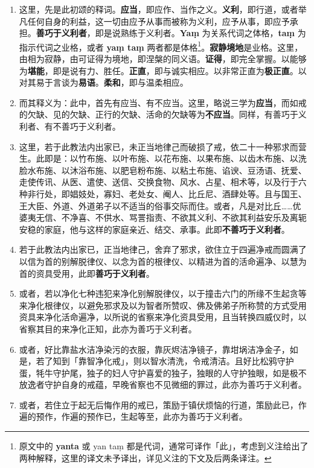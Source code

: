 \begin{enumerate}\item 这里，先是此初颂的释词。\textbf{应当}，即应作、当作之义。\textbf{义利}，即行道，或者举凡任何自身的利益，这一切由应予从事而被称为义利，应予从事，即应予承担。\textbf{善巧于义利者}，即是说熟练于义利者。\textbf{Yaṃ} 为关系代词之体格，\textbf{taṃ} 为指示代词之业格，或者 \textbf{yaṃ taṃ} 两者都是体格\footnote{原文中的 \textbf{yanta} 或 yan taṃ 都是代词，通常可译作「此」，考虑到义注给出了两种解释，这里的译文未予译出，详见义注的下文及后两条译注。}。\textbf{寂静境地}是业格。这里，由相为寂静，由可证得为境地，即涅槃的同义语。\textbf{证得}，即完全掌握。以能够为\textbf{堪能}，即是说有力、胜任。\textbf{正直}，即与诚实相应。以非常正直为\textbf{极正直}。以对其易于言谈为\textbf{易语}。\textbf{柔和}，即与温柔相应。
\item 而其释义为：此中，首先有应当、有不应当。这里，略说三学为\textbf{应当}，而如戒的欠缺、见的欠缺、正行的欠缺、活命的欠缺等为\textbf{不应当}。同样，有善巧于义利者、有不善巧于义利者。
\item 这里，若于此教法内出家已，未正当地律己而破损了戒，依二十一种邪求而营生。此即是：以竹布施、以叶布施、以花布施、以果布施、以齿木布施、以洗脸水布施、以沐浴布施、以肥皂粉布施、以粘土布施、谄谀、豆汤语、抚爱、走使传讯、从医、遣使、送信、交换食物、风水、占星、相术等，以及行于六种非行处，即娼妓处，寡妇、老处女、阉人、比丘尼、酒肆处等。且与国王、王大臣、外道、外道弟子以不适当的俗事交际而住。或者，凡是对比丘……优婆夷无信、不净喜、不供水、骂詈指责、不欲其义利、不欲其利益安乐及离轭安稳的家庭，他与这样的家庭亲近、结交、承事。此即\textbf{不善巧于义利者}。
\item 若于此教法内出家已，正当地律己，舍弃了邪求，欲住立于四遍净戒而圆满了以信为首的别解脱律仪、以念为首的根律仪、以精进为首的活命遍净、以慧为首的资具受用，此即\textbf{善巧于义利者}。
\item 或者，若以净化七种违犯来净化别解脱律仪，以于撞击六门的所缘不生起贪等来净化根律仪，以避免邪求及以为智者所赞叹、佛及佛弟子所称赞的方式受用资具来净化活命遍净，以所说的省察来净化资具受用，且当转换四威仪时，以省察其目的来净化正知，此亦为善巧于义利者。
\item 或者，好比靠盐水洁净染污的衣服，靠灰烬洁净镜子，靠坩埚洁净金子，如是，若了知到「靠智净化戒」，则以智水清洗，令戒清洁。且好比松鸦守护蛋，牦牛守护尾，独子的妇人守护喜爱的独子，独眼的人守护独眼，如是极不放逸者守护自身的戒蕴，早晚省察也不见微细的罪过，此亦为善巧于义利者。
\item 或者，若住立于起无后悔作用的戒已，策励于镇伏烦恼的行道，策励此已，作遍的预作，作遍的预作已，生起等至，此亦为善巧于义利者。

\end{enumerate}
